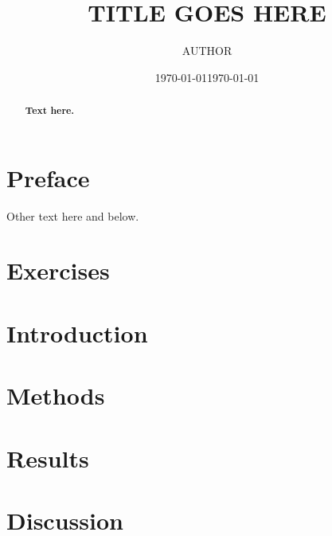 \documentclass[10pt]{article}
\title
{\bf
  TITLE GOES HERE 
}
\author{AUTHOR}
\date{\today}
\theoremstyle{plain}
\begin{document}
\date{\today}
\maketitle
\setcounter{page}{1}
\begin{abstract}
{\bf 
  Text here.
}
\end{abstract}
\begin{multicols}{2}
\section*{Preface}
Other text here and below.%
\section*{Exercises}
\section*{Introduction}
\section*{Methods}
\section*{Results}
\section*{Discussion}


%
\end{multicols}
\end{document}

